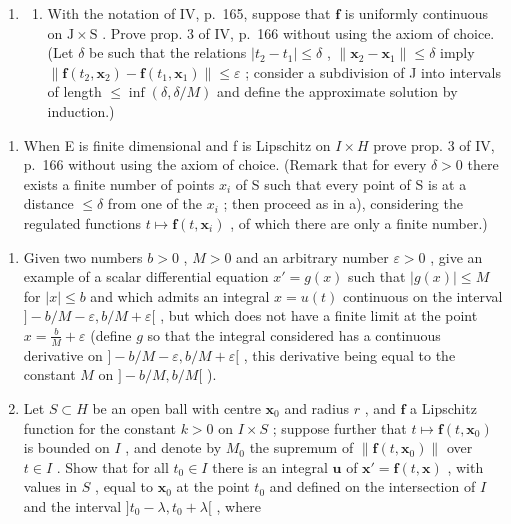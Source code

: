 \begin{enumerate}
\def\labelenumi{\arabic{enumi})}
\tightlist
\item
  \begin{enumerate}
  \def\labelenumii{\alph{enumii})}
  \tightlist
  \item
    With the notation of IV, p.~165, suppose that \(\mathbf{f}\) is uniformly continuous on \(\mathrm{J} \times \mathrm{S}\) . Prove prop. 3 of IV, p.~166 without using the axiom of choice. (Let \(\delta\) be such that the relations \(|t_2 - t_1| \leqslant \delta\) , \(\| \mathbf{x}_2 - \mathbf{x}_1 \| \leqslant \delta\) imply \(\| \mathbf{f}(t_2, \mathbf{x}_2) - \mathbf{f}(t_1, \mathbf{x}_1) \| \leqslant \varepsilon\) ; consider a subdivision of J into intervals of length \(\leqslant \inf(\delta, \delta / M)\) and define the approximate solution by induction.)
  \end{enumerate}
\end{enumerate}

\begin{enumerate}
\def\labelenumi{\alph{enumi})}
\setcounter{enumi}{1}
\tightlist
\item
  When E is finite dimensional and f is Lipschitz on \(I \times H\) prove prop. 3 of IV, p.~166 without using the axiom of choice. (Remark that for every \(\delta > 0\) there exists a finite number of points \(x_{i}\) of S such that every point of S is at a distance \(\leqslant \delta\) from one of the \(x_{i}\) ; then proceed as in a), considering the regulated functions \(t \mapsto \mathbf{f}(t, \mathbf{x}_{i})\) , of which there are only a finite number.)
\end{enumerate}

\begin{enumerate}
\def\labelenumi{\arabic{enumi})}
\setcounter{enumi}{1}
\item
  Given two numbers \(b > 0\) , \(M > 0\) and an arbitrary number \(\varepsilon > 0\) , give an example of a scalar differential equation \(x' = g(x)\) such that \(|g(x)| \leqslant M\) for \(|x| \leqslant b\) and which admits an integral \(x = u(t)\) continuous on the interval \(] - b/M - \varepsilon, b/M + \varepsilon[\) , but which does not have a finite limit at the point \(x = \frac{b}{M} + \varepsilon\) (define \(g\) so that the integral considered has a continuous derivative on \(] - b/M - \varepsilon, b/M + \varepsilon[\) , this derivative being equal to the constant \(M\) on \(] - b/M, b/M[\) ).
\item
  Let \(S \subset H\) be an open ball with centre \(\mathbf{x}_0\) and radius \(r\) , and \(\mathbf{f}\) a Lipschitz function for the constant \(k > 0\) on \(I \times S\) ; suppose further that \(t \mapsto \mathbf{f}(t, \mathbf{x}_0)\) is bounded on \(I\) , and denote by \(M_0\) the supremum of \(\| \mathbf{f}(t, \mathbf{x}_0) \|\) over \(t \in I\) . Show that for all \(t_0 \in I\) there is an integral \(\mathbf{u}\) of \(\mathbf{x}' = \mathbf{f}(t, \mathbf{x})\) , with values in \(S\) , equal to \(\mathbf{x}_0\) at the point \(t_0\) and defined on the intersection of \(I\) and the interval \(]t_0 - \lambda, t_0 + \lambda[\) , where
\end{enumerate}

